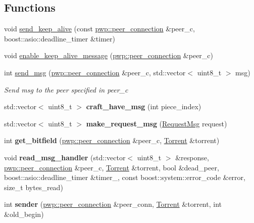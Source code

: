 \subsection*{Functions}
\begin{DoxyCompactItemize}
\item 
void \hyperlink{namespacepwp__msg_a9a577f5a53b823d83bb4694f1ebf141e}{send\+\_\+keep\+\_\+alive} (const \hyperlink{structpwp_1_1peer__connection}{pwp\+::peer\+\_\+connection} \&peer\+\_\+c, boost\+::asio\+::deadline\+\_\+timer \&timer)
\item 
void \hyperlink{namespacepwp__msg_a30c14bc06a8bb851ca79781cb9686b4f}{enable\+\_\+keep\+\_\+alive\+\_\+message} (\hyperlink{structpwp_1_1peer__connection}{pwp\+::peer\+\_\+connection} \&peer\+\_\+c)
\item 
int \hyperlink{namespacepwp__msg_aca807c6281879abef952f8feecccb6e8}{send\+\_\+msg} (\hyperlink{structpwp_1_1peer__connection}{pwp\+::peer\+\_\+connection} \&peer\+\_\+c, std\+::vector$<$ uint8\+\_\+t $>$ msg)
\begin{DoxyCompactList}\small\item\em Send {\ttfamily msg} to the peer specified in {\ttfamily peer\+\_\+c} \end{DoxyCompactList}\item 
\mbox{\label{namespacepwp__msg_a529a3db7938ccfaab85579d58e24061e}} 
std\+::vector$<$ uint8\+\_\+t $>$ {\bfseries craft\+\_\+have\+\_\+msg} (int piece\+\_\+index)
\item 
\mbox{\label{namespacepwp__msg_a2dcbe5fbe0eeca8910340f4978ee4235}} 
std\+::vector$<$ uint8\+\_\+t $>$ {\bfseries make\+\_\+request\+\_\+msg} (\hyperlink{structRequestMsg}{Request\+Msg} request)
\item 
\mbox{\label{namespacepwp__msg_aa9cc2ccac70638ed59075f27f938b8ec}} 
int {\bfseries get\+\_\+bitfield} (\hyperlink{structpwp_1_1peer__connection}{pwp\+::peer\+\_\+connection} \&peer\+\_\+c, \hyperlink{structTorrent}{Torrent} \&torrent)
\item 
\mbox{\label{namespacepwp__msg_aec35de04a2f2d9cb6abdd777917cfaae}} 
void {\bfseries read\+\_\+msg\+\_\+handler} (std\+::vector$<$ uint8\+\_\+t $>$ \&response, \hyperlink{structpwp_1_1peer__connection}{pwp\+::peer\+\_\+connection} \&peer\+\_\+c, \hyperlink{structTorrent}{Torrent} \&torrent, bool \&dead\+\_\+peer, boost\+::asio\+::deadline\+\_\+timer \&timer\+\_\+, const boost\+::system\+::error\+\_\+code \&error, size\+\_\+t bytes\+\_\+read)
\item 
\mbox{\label{namespacepwp__msg_ab578b213d293636d33efc24382f16b25}} 
int {\bfseries sender} (\hyperlink{structpwp_1_1peer__connection}{pwp\+::peer\+\_\+connection} \&peer\+\_\+conn, \hyperlink{structTorrent}{Torrent} \&torrent, int \&old\+\_\+begin)
\end{DoxyCompactItemize}

